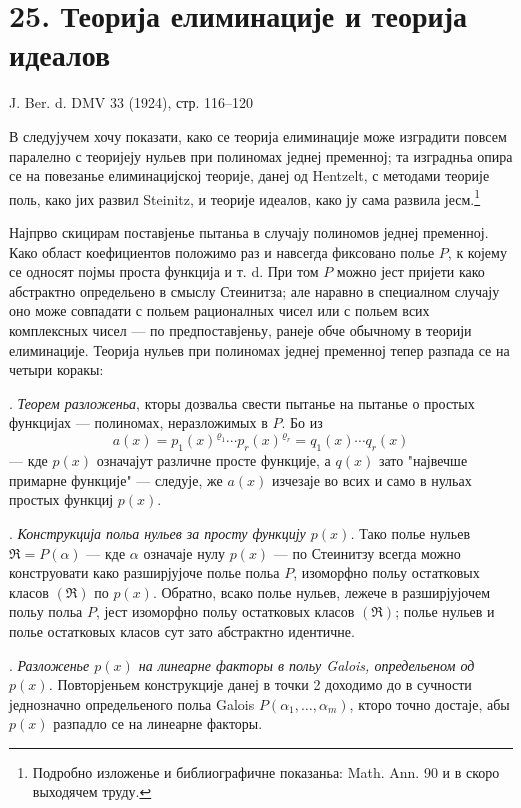 ﻿\documentclass[11pt]{article}
\providecommand{\frakR}{\mathfrak R}
\begin{document}
\setcounter{footnote}{0}

\section*{25. Теорија елиминације и теорија идеалов}

\begin{center}
J. Ber. d. DMV 33 (1924), стр. 116--120
\end{center}

В следујучем хочу показати, како се теорија елиминације може изградити повсем паралелно с теоријеју нульев при полиномах једнеј пременној; та изградньа опира се на повезанье елиминацијској теорије, данеј од Hentzelt, с методами теорије поль, како јих развил Steinitz, и теорије идеалов, како ју сама развила јесм.\footnote{Подробно изложенье и библиографичне показаньа: Math. Ann. 90 и в скоро выходячем труду.}

Најпрво скицирам поставјенье пытаньа в случају полиномов једнеј пременној. Како област коефициентов положимо раз и навсегда фиксовано полье $P$, к којему се односят појмы проста функција и т. d. При том $P$ можно јест пријети како абстрактно определьено в смыслу Стеинитза; але наравно в специалном случају оно може совпадати с польем рационалных чисел или с польем всих комплексных чисел --- по предпоставјеньу, ранеје обче обычному в теорији елиминације. Теорија нульев при полиномах једнеј пременној тепер разпада се на четыри коракы:

. \emph{Теорем разложеньа}, кторы дозвальа свести пытанье на пытанье о простых функцијах --- полиномах, неразложимых в $P$. Бо из
\[
 a(x)=p_1(x)^{\varrho_1}\cdots p_r(x)^{\varrho_r}=q_1(x)\cdots q_r(x)
\]
--- кде $p(x)$ означајут различне просте функције, а $q(x)$ зато "највечше примарне функције" --- следује, же $a(x)$ изчезаје во всих и само в нульах простых функциј $p(x)$.

. \emph{Конструкција польа нульев за просту функцију $p(x)$.} Тако полье нульев $\frakR=P(\alpha)$ --- кде $\alpha$ означаје нулу $p(x)$ --- по Стеинитзу всегда можно конструовати како разширјујоче полье польа $P$, изоморфно польу остатковых класов $(\frakR)$ по $p(x)$. Обратно, всако полье нульев, лежече в разширјујочем польу польа $P$, јест изоморфно польу остатковых класов $(\frakR)$; полье нульев и полье остатковых класов сут зато абстрактно идентичне.

. \emph{Разложенье $p(x)$ на линеарне факторы в польу Galois, определьеном од $p(x)$.} Повторјеньем конструкције данеј в точки 2 доходимо до в сучности једнозначно определьеного польа Galois $P(\alpha_1,\ldots,\alpha_m)$, кторо точно достаје, абы $p(x)$ разпадло се на линеарне факторы.
\end{document}
